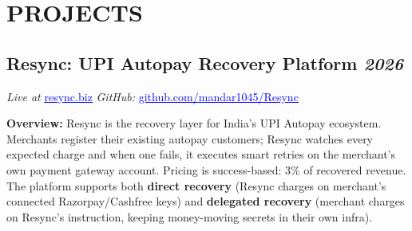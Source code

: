 \documentclass[letterpaper,10pt]{article}
\begin{document}
\section{PROJECTS}

\subsection{Resync: UPI Autopay Recovery Platform \hfill \normalfont\textit{2026}}
\noindent
\textit{Live at} \href{https://resync.biz}{\textcolor{blue}{\underline{resync.biz}}} \enspace\textbar{}\enspace
\textit{GitHub:} \href{https://github.com/mandar1045/Resync}{\textcolor{blue}{\underline{github.com/mandar1045/Resync}}}

\vspace{4pt}
\noindent
\textbf{Overview:} Resync is the recovery layer for India's UPI Autopay ecosystem. Merchants register their existing autopay customers; Resync watches every expected charge and when one fails, it executes smart retries on the merchant's own payment gateway account. Pricing is success-based: 3\% of recovered revenue. The platform supports both \textbf{direct recovery} (Resync charges on merchant's connected Razorpay/Cashfree keys) and \textbf{delegated recovery} (merchant charges on Resync's instruction, keeping money-moving secrets in their own infra).
\end{document}
